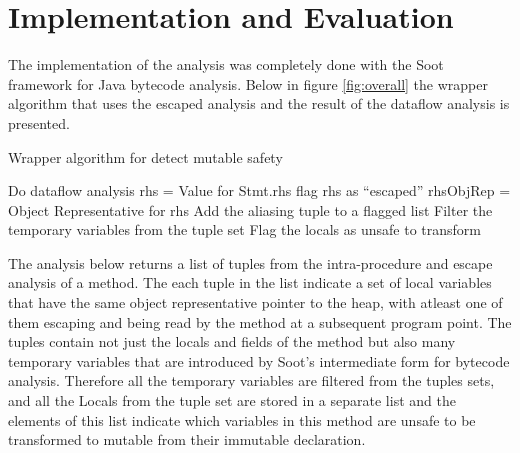 \section{Implementation and Evaluation}
The implementation of the analysis was completely done with the Soot framework\citep{ref:Soot} for Java bytecode analysis. Below in figure \ref{fig:overall} the wrapper algorithm that uses the escaped analysis and the result of the dataflow analysis is presented.

\begin{algorithm}
\caption{Wrapper algorithm for detect mutable safety}
\label{fig:overall}
\begin{algorithmic}
  \State Do dataflow analysis\;
       \State rhs = Value for Stmt.rhs
           \State flag rhs as ``escaped''
       \EndIf
       \State rhsObjRep = Object Representative for rhs
		      \State Add the aliasing tuple to a flagged list
       	  \EndIf
       \EndIf
  \EndFor
  \State Filter the temporary variables from the tuple set
  \State Flag the locals as unsafe to transform
\end{algorithmic}
\end{algorithm}

The analysis below returns a list of tuples from the intra-procedure and escape analysis of a method. The each tuple in the list indicate a set of local variables that have the same object representative pointer to the heap, with atleast one of them escaping and being read by the method at a subsequent program point. The tuples contain not just the locals and fields of the method but also many temporary variables that are introduced by Soot's intermediate form for bytecode analysis. Therefore all the temporary variables are filtered from the tuples sets, and all the Locals from the tuple set are stored in a separate list and the elements of this list indicate which variables in this method are unsafe to be transformed to mutable from their immutable declaration.

